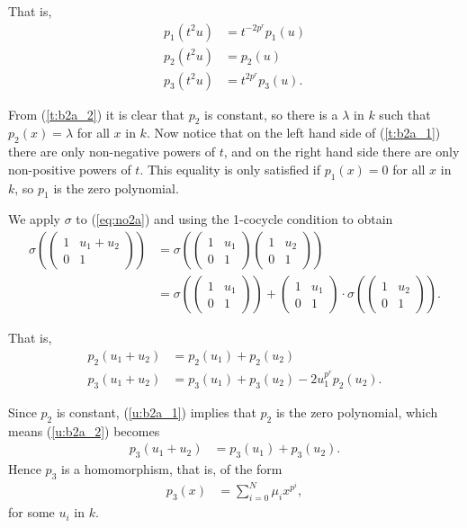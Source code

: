 That is,
\begin{align}
\label{t:b2a_1}
p_1(t^2u) &= t^{-2p^r} p_1(u) \\
\label{t:b2a_2}
p_2(t^2u) &= p_2(u) \\
\label{t:b2a_3}
p_3(t^2u) &=  t^{2p^r}p_3(u).
\end{align}

From (\ref{t:b2a_2}) it is clear that $p_2$ is constant, so there is a $\lambda$ in $k$ such that $p_2(x)=\lambda$ for all $x$ in $k$. Now notice that on the left hand side of (\ref{t:b2a_1}) there are only non-negative powers of $t$, and on the right hand side there are only non-positive powers of $t$. This equality is only satisfied if $p_1(x)=0$ for all $x$ in $k$, so $p_1$ is the zero polynomial.

We apply $\sigma$ to (\ref{eq:no2a}) and using the 1-cocycle condition to obtain
\begin{align*}
\sigma\left(
\left(\begin{matrix} 1 & u_1 + u_2 \\ 0 & 1 \end{matrix}\right)
\right)
&=
\sigma\left(
\left(\begin{matrix} 1 & u_1 \\ 0 & 1 \end{matrix}\right) 
\left(\begin{matrix} 1 & u_2 \\ 0 & 1 \end{matrix}\right)
\right) \\
&=
\sigma\left(
\left(\begin{matrix} 1 & u_1 \\ 0 & 1 \end{matrix}\right)
\right) +
\left(\begin{matrix} 1 & u_1 \\ 0 & 1 \end{matrix}\right) \cdot
\sigma\left(
\left(\begin{matrix} 1 & u_2 \\ 0 & 1 \end{matrix}\right)
\right).
\end{align*}

That is,
\begin{align}
\label{u:b2a_1}
p_2(u_1 + u_2) &= p_2(u_1) + p_2(u_2) \\
\label{u:b2a_2}
p_3(u_1 + u_2) &= p_3(u_1) + p_3(u_2) - 2u_1^{p^r}p_2(u_2).
\end{align}


Since $p_2$ is constant, (\ref{u:b2a_1}) implies that $p_2$ is the zero polynomial, which means (\ref{u:b2a_2}) becomes
\begin{align*}
p_3(u_1 + u_2) &= p_3(u_1) + p_3(u_2). 
\end{align*}
Hence $p_3$ is a homomorphism, that is, of the form
\begin{align}
\label{p:b2a_1}
p_3(x) &= \sum_{i=0}^N \mu_i x^{p^i},
\end{align}
for some $u_i$ in $k$.

